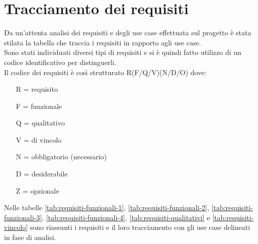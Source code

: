\section{Tracciamento dei requisiti}

Da un'attenta analisi dei requisiti e degli use case effettuata sul progetto è stata stilata la tabella che traccia i requisiti in rapporto agli use case.\\
Sono stati individuati diversi tipi di requisiti e si è quindi fatto utilizzo di un codice identificativo per distinguerli.\\
Il codice dei requisiti è così strutturato R(F/Q/V)(N/D/O) dove:
\begin{enumerate}
	\item[R =] requisito
    \item[F =] funzionale
    \item[Q =] qualitativo
    \item[V =] di vincolo
    \item[N =] obbligatorio (necessario)
    \item[D =] desiderabile
    \item[Z =] opzionale
\end{enumerate}
Nelle tabelle \ref{tab:requisiti-funzionali-1}, \ref{tab:requisiti-funzionali-2}, \ref{tab:requisiti-funzionali-3}, \ref{tab:requisiti-funzionali-4}, \ref{tab:requisiti-qualitativi} e \ref{tab:requisiti-vincolo} sono riassunti i requisiti e il loro tracciamento con gli use case delineati in fase di analisi.

\clearpage


